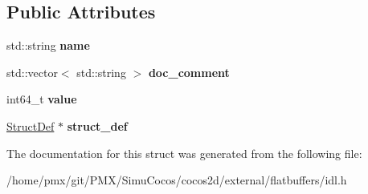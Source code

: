 \subsection*{Public Attributes}
\begin{DoxyCompactItemize}
\item 
\mbox{\label{structflatbuffers_1_1EnumVal_a2a0a18b9db17e7ffcadac7d2e296540d}} 
std\+::string {\bfseries name}
\item 
\mbox{\label{structflatbuffers_1_1EnumVal_af5b1a2491d01d8122434c24e564d9b7e}} 
std\+::vector$<$ std\+::string $>$ {\bfseries doc\+\_\+comment}
\item 
\mbox{\label{structflatbuffers_1_1EnumVal_a5064a50dc998fad89948618d5161c312}} 
int64\+\_\+t {\bfseries value}
\item 
\mbox{\label{structflatbuffers_1_1EnumVal_acbd5c4c2e7e4aa2c6f4c375690441161}} 
\hyperlink{structflatbuffers_1_1StructDef}{Struct\+Def} $\ast$ {\bfseries struct\+\_\+def}
\end{DoxyCompactItemize}


The documentation for this struct was generated from the following file\+:\begin{DoxyCompactItemize}
\item 
/home/pmx/git/\+P\+M\+X/\+Simu\+Cocos/cocos2d/external/flatbuffers/idl.\+h\end{DoxyCompactItemize}
